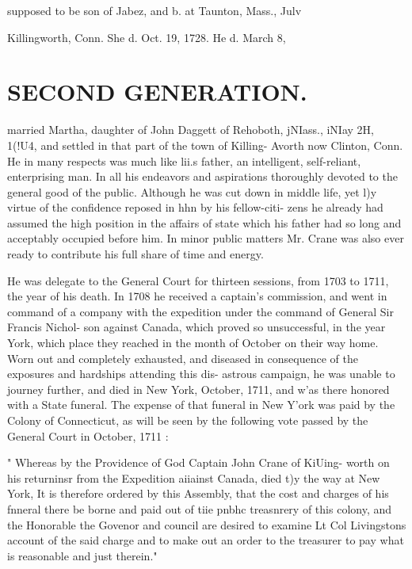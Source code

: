 \documentclass{book}
\begin{document}
supposed to be son of Jabez, and b. at Taunton, Mass., Julv 


Killingworth, Conn. She d. Oct. 19, 1728. He d. March 8, 




\section{SECOND GENERATION.}


married Martha, daughter of John Daggett of Rehoboth, jNIass., 
iNIay 2H, 1(!U4, and settled in that part of the town of Killing- 
Avorth now Clinton, Conn. He in many respects was much like 
lii.s father, an intelligent, self-reliant, enterprising man. In all 
his endeavors and aspirations thoroughly devoted to the general 
good of the public. Although he was cut down in middle life, 
yet l)y virtue of the confidence reposed in hhn by his fellow-citi- 
zens he already had assumed the high position in the affairs of 
state which his father had so long and acceptably occupied before 
him. In minor public matters Mr. Crane was also ever ready to 
contribute his full share of time and energy. 

He was delegate to the General Court for thirteen sessions, 
from 1703 to 1711, the year of his death. In 1708 he received a 
captain's commission, and went in command of a company with 
the expedition under the command of General Sir Francis Nichol- 
son against Canada, which proved so unsuccessful, in the year 
York, which place they reached in the month of October on their 
way home. Worn out and completely exhausted, and diseased 
in consequence of the exposures and hardships attending this dis- 
astrous campaign, he was unable to journey further, and died in 
New York, October, 1711, and w'as there honored with a State 
funeral. The expense of that funeral in New Y'ork was paid by 
the Colony of Connecticut, as will be seen by the following vote 
passed by the General Court in October, 1711 : 

" Whereas by the Providence of God Captain John Crane of KiUing- 
worth on his returninsr from the Expedition aiiainst Canada, died t)y the 
way at New York, It is therefore ordered by this Assembly, that the 
cost and charges of his fnneral there be borne and paid out of tiie pnbhc 
treasnrery of this colony, and the Honorable the Govenor and council 
are desired to examine Lt Col Livingstons account of the said charge 
and to make out an order to the treasurer to pay what is reasonable and 
just therein." 
\end{document}
